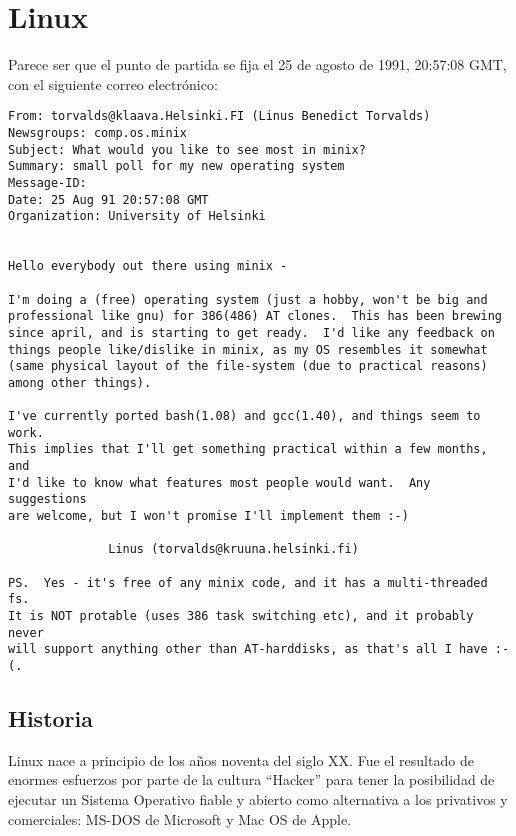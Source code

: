 \chapter{Linux}

\label{sec:mailLinus}

Parece ser que el punto de partida se fija el 25 de agosto de 1991, 20:57:08
GMT, con el siguiente correo
electr\'onico\endnote{}:

\begin{verbatim}
From: torvalds@klaava.Helsinki.FI (Linus Benedict Torvalds)
Newsgroups: comp.os.minix
Subject: What would you like to see most in minix?
Summary: small poll for my new operating system
Message-ID:
Date: 25 Aug 91 20:57:08 GMT
Organization: University of Helsinki


Hello everybody out there using minix -

I'm doing a (free) operating system (just a hobby, won't be big and
professional like gnu) for 386(486) AT clones.  This has been brewing
since april, and is starting to get ready.  I'd like any feedback on
things people like/dislike in minix, as my OS resembles it somewhat
(same physical layout of the file-system (due to practical reasons)
among other things).

I've currently ported bash(1.08) and gcc(1.40), and things seem to work.
This implies that I'll get something practical within a few months, and
I'd like to know what features most people would want.  Any suggestions
are welcome, but I won't promise I'll implement them :-)

              Linus (torvalds@kruuna.helsinki.fi)

PS.  Yes - it's free of any minix code, and it has a multi-threaded fs.
It is NOT protable (uses 386 task switching etc), and it probably never
will support anything other than AT-harddisks, as that's all I have :-(.
\end{verbatim}

\section{Historia}
Linux nace a principio de los años noventa del siglo XX. Fue el resultado de 
enormes esfuerzos por parte de la cultura ``Hacker'' para tener la posibilidad 
de ejecutar un Sistema Operativo fiable y abierto como alternativa a los 
privativos y comerciales: MS-DOS de Microsoft y Mac OS de Apple.


